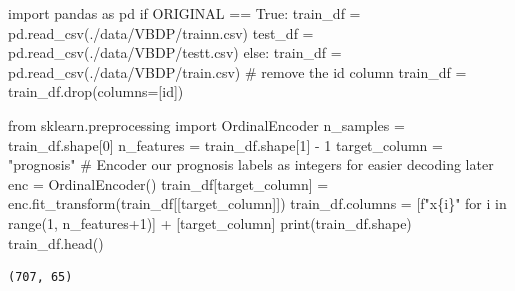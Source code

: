 \documentclass[
  letterpaper,
  DIV=11,
  numbers=noendperiod]{scrreprt}
\newenvironment{Shaded}{\begin{snugshade}}{\end{snugshade}}
\newcommand{\BuiltInTok}[1]{\textcolor[rgb]{0.00,0.23,0.31}{#1}}
\newcommand{\CommentTok}[1]{\textcolor[rgb]{0.37,0.37,0.37}{#1}}
\newcommand{\ControlFlowTok}[1]{\textcolor[rgb]{0.00,0.23,0.31}{#1}}
\newcommand{\DecValTok}[1]{\textcolor[rgb]{0.68,0.00,0.00}{#1}}
\newcommand{\ImportTok}[1]{\textcolor[rgb]{0.00,0.46,0.62}{#1}}
\newcommand{\KeywordTok}[1]{\textcolor[rgb]{0.00,0.23,0.31}{#1}}
\newcommand{\NormalTok}[1]{\textcolor[rgb]{0.00,0.23,0.31}{#1}}
\newcommand{\OperatorTok}[1]{\textcolor[rgb]{0.37,0.37,0.37}{#1}}
\newcommand{\SpecialCharTok}[1]{\textcolor[rgb]{0.37,0.37,0.37}{#1}}
\newcommand{\SpecialStringTok}[1]{\textcolor[rgb]{0.13,0.47,0.30}{#1}}
\newcommand{\StringTok}[1]{\textcolor[rgb]{0.13,0.47,0.30}{#1}}
\newcommand{\VariableTok}[1]{\textcolor[rgb]{0.07,0.07,0.07}{#1}}
\begin{document}
\begin{Shaded}
\begin{Highlighting}[]
\ImportTok{import}\NormalTok{ pandas }\ImportTok{as}\NormalTok{ pd}
\ControlFlowTok{if}\NormalTok{ ORIGINAL }\OperatorTok{==} \VariableTok{True}\NormalTok{:}
\NormalTok{    train\_df }\OperatorTok{=}\NormalTok{ pd.read\_csv(}\StringTok{\textquotesingle{}./data/VBDP/trainn.csv\textquotesingle{}}\NormalTok{)}
\NormalTok{    test\_df }\OperatorTok{=}\NormalTok{ pd.read\_csv(}\StringTok{\textquotesingle{}./data/VBDP/testt.csv\textquotesingle{}}\NormalTok{)}
\ControlFlowTok{else}\NormalTok{:}
\NormalTok{    train\_df }\OperatorTok{=}\NormalTok{ pd.read\_csv(}\StringTok{\textquotesingle{}./data/VBDP/train.csv\textquotesingle{}}\NormalTok{)}
    \CommentTok{\# remove the id column}
\NormalTok{    train\_df }\OperatorTok{=}\NormalTok{ train\_df.drop(columns}\OperatorTok{=}\NormalTok{[}\StringTok{\textquotesingle{}id\textquotesingle{}}\NormalTok{])}
\end{Highlighting}
\end{Shaded}

\begin{Shaded}
\begin{Highlighting}[]
\ImportTok{from}\NormalTok{ sklearn.preprocessing }\ImportTok{import}\NormalTok{ OrdinalEncoder}
\NormalTok{n\_samples }\OperatorTok{=}\NormalTok{ train\_df.shape[}\DecValTok{0}\NormalTok{]}
\NormalTok{n\_features }\OperatorTok{=}\NormalTok{ train\_df.shape[}\DecValTok{1}\NormalTok{] }\OperatorTok{{-}} \DecValTok{1}
\NormalTok{target\_column }\OperatorTok{=} \StringTok{"prognosis"}
\CommentTok{\# Encoder our prognosis labels as integers for easier decoding later}
\NormalTok{enc }\OperatorTok{=}\NormalTok{ OrdinalEncoder()}
\NormalTok{train\_df[target\_column] }\OperatorTok{=}\NormalTok{ enc.fit\_transform(train\_df[[target\_column]])}
\NormalTok{train\_df.columns }\OperatorTok{=}\NormalTok{ [}\SpecialStringTok{f"x}\SpecialCharTok{\{}\NormalTok{i}\SpecialCharTok{\}}\SpecialStringTok{"} \ControlFlowTok{for}\NormalTok{ i }\KeywordTok{in} \BuiltInTok{range}\NormalTok{(}\DecValTok{1}\NormalTok{, n\_features}\OperatorTok{+}\DecValTok{1}\NormalTok{)] }\OperatorTok{+}\NormalTok{ [target\_column]}
\BuiltInTok{print}\NormalTok{(train\_df.shape)}
\NormalTok{train\_df.head()}
\end{Highlighting}
\end{Shaded}

\begin{verbatim}
(707, 65)
\end{verbatim}
\end{document}
